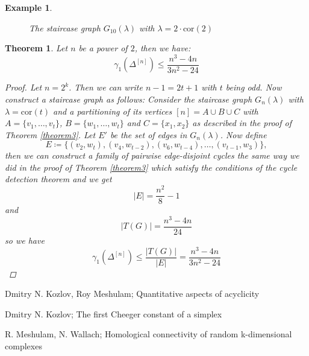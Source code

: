 \documentclass{article}
\newtheorem{thm}{Theorem}[section]
\newtheorem{expl}{Example}[section]
\begin{document}
\begin{expl}
\begin{figure}[ht]
  \caption{The staircase graph $G_{10}(\lambda)$ with $\lambda=2\cdot\text{cor}(2)$}
  \label{figure1:Figure 1}
\end{figure}
\end{expl}

\begin{thm}\label{theorem4}
Let $n$ be a power of $2$, then we have:
\[
\gamma_1(\Delta^{[n]})\leq\frac{n^3-4n}{3n^2-24}
\]
\begin{proof}
Let $n=2^k$. Then we can write $n-1=2t+1$ with $t$ being odd. Now construct a staircase graph as follows:
Consider the staircase graph $G_n(\lambda)$ with $\lambda=\text{cor}(t)$ and a partitioning of its vertices $[n]=A\cup B\cup C$ with $A=\{v_1,\ldots,v_t\}$, $B=\{w_1,\ldots,w_t\}$ and $C=\{x_1,x_2\}$ as described in the proof of Theorem \ref{theorem3}. Let $E'$ be the set of edges in $G_n(\lambda)$. Now define
\[
E\coloneqq\{(v_2,w_t),(v_4,w_{t-2}),(v_6,w_{t-4}),\ldots,(v_{t-1},w_3)\},
\]
then we can construct a family of pairwise edge-disjoint cycles the same way we did in the proof of Theorem \ref{theorem3} which satisfy the conditions of the cycle detection theorem and we get
\[
|E|=\frac{n^2}{8}-1
\]
and
\[
|T(G)|=\frac{n^3-4n}{24}
\]
so we have
\[
\gamma_1(\Delta^{[n]})\leq\frac{|T(G)|}{|E|}=\frac{n^3-4n}{3n^2-24}
\]
\end{proof}
\end{thm}

\begin{thebibliography}{9}

 Dmitry N. Kozlov, Roy Meshulam; Quantitative aspects of acyclicity

 Dmitry N. Kozlov; The first Cheeger constant of a simplex

 R. Meshulam, N. Wallach; Homological connectivity of random k-dimensional complexes

\end{thebibliography}
\end{document}
